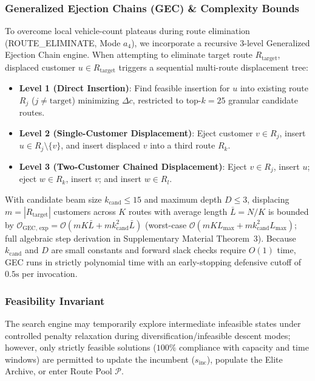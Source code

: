 \documentclass{ieeeaccess}
\begin{document}
\subsubsection{Generalized Ejection Chains (GEC) \& Complexity Bounds}
\label{sec:gec_methodology}
To overcome local vehicle-count plateaus during route elimination (\textsf{\small ROUTE\_\allowbreak ELIMINATE}, Mode $a_4$), we incorporate a recursive 3-level Generalized Ejection Chain engine. When attempting to eliminate target route $R_{\text{target}}$, displaced customer $u \in R_{\text{target}}$ triggers a sequential multi-route displacement tree:
\begin{itemize}
    \item \textbf{Level 1 (Direct Insertion)}: Find feasible insertion for $u$ into existing route $R_j$ ($j \neq \text{target}$) minimizing $\Delta c$, restricted to top-$k=25$ granular candidate routes.
    \item \textbf{Level 2 (Single-Customer Displacement)}: Eject customer $v \in R_j$, insert $u \in R_j \setminus \{v\}$, and insert displaced $v$ into a third route $R_k$.
    \item \textbf{Level 3 (Two-Customer Chained Displacement)}: Eject $v \in R_j$, insert $u$; eject $w \in R_k$, insert $v$; and insert $w \in R_l$.
\end{itemize}
With candidate beam size $k_{\text{cand}} \le 15$ and maximum depth $D \le 3$, displacing $m = |R_{\text{target}}|$ customers across $K$ routes with average length $\bar{L} = N/K$ is bounded by $\mathcal{O}_{\text{GEC, exp}} = \mathcal{O}(m K \bar{L} + m k_{\text{cand}}^2 \bar{L})$ (worst-case $\mathcal{O}(m K L_{\max} + m k_{\text{cand}}^2 L_{\max})$; full algebraic step derivation in Supplementary Material Theorem~3). Because $k_{\text{cand}}$ and $D$ are small constants and forward slack checks require $O(1)$ time, GEC runs in strictly polynomial time with an early-stopping defensive cutoff of $0.5\text{s}$ per invocation.

\subsubsection{Feasibility Invariant}
The search engine may temporarily explore intermediate infeasible states under controlled penalty relaxation during diversification/infeasible descent modes; however, only strictly feasible solutions ($100\%$ compliance with capacity and time windows) are permitted to update the incumbent ($s_{\text{inc}}$), populate the Elite Archive, or enter Route Pool $\mathcal{P}$.
\end{document}
